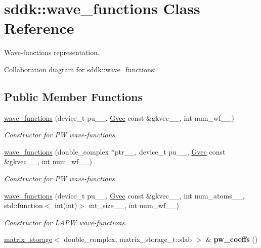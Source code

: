 \hypertarget{classsddk_1_1wave__functions}{}\section{sddk\+:\+:wave\+\_\+functions Class Reference}
\label{classsddk_1_1wave__functions}


Wave-\/functions representation.  




Collaboration diagram for sddk\+:\+:wave\+\_\+functions\+:
\subsection*{Public Member Functions}
\begin{DoxyCompactItemize}
\item 
\hyperlink{classsddk_1_1wave__functions_a2a8368abf199dc4c5ab25e1922767a31}{wave\+\_\+functions} (device\+\_\+t pu\+\_\+\+\_\+, \hyperlink{classsddk_1_1_gvec}{Gvec} const \&gkvec\+\_\+\+\_\+, int num\+\_\+wf\+\_\+\+\_\+)
\begin{DoxyCompactList}\small\item\em Constructor for P\+W wave-\/functions. \end{DoxyCompactList}\item 
\hyperlink{classsddk_1_1wave__functions_abf07a19541926a8e40798bb3c8410165}{wave\+\_\+functions} (double\+\_\+complex $\ast$ptr\+\_\+\+\_\+, device\+\_\+t pu\+\_\+\+\_\+, \hyperlink{classsddk_1_1_gvec}{Gvec} const \&gkvec\+\_\+\+\_\+, int num\+\_\+wf\+\_\+\+\_\+)
\begin{DoxyCompactList}\small\item\em Constructor for P\+W wave-\/functions. \end{DoxyCompactList}\item 
\hyperlink{classsddk_1_1wave__functions_a4f2d645f29077c03d56aec3fb810883d}{wave\+\_\+functions} (device\+\_\+t pu\+\_\+\+\_\+, \hyperlink{classsddk_1_1_gvec}{Gvec} const \&gkvec\+\_\+\+\_\+, int num\+\_\+atoms\+\_\+\+\_\+, std\+::function$<$ int(int)$>$ mt\+\_\+size\+\_\+\+\_\+, int num\+\_\+wf\+\_\+\+\_\+)
\begin{DoxyCompactList}\small\item\em Constructor for L\+A\+P\+W wave-\/functions. \end{DoxyCompactList}\item 
\hypertarget{classsddk_1_1wave__functions_a1a1e2f8921d05ed1fe35405b4c5076c1}{}\hyperlink{classsddk_1_1matrix__storage}{matrix\+\_\+storage}$<$ double\+\_\+complex, matrix\+\_\+storage\+\_\+t\+::slab $>$ \& {\bfseries pw\+\_\+coeffs} ()\label{classsddk_1_1wave__functions_a1a1e2f8921d05ed1fe35405b4c5076c1}


\end{DoxyCompactItemize}
